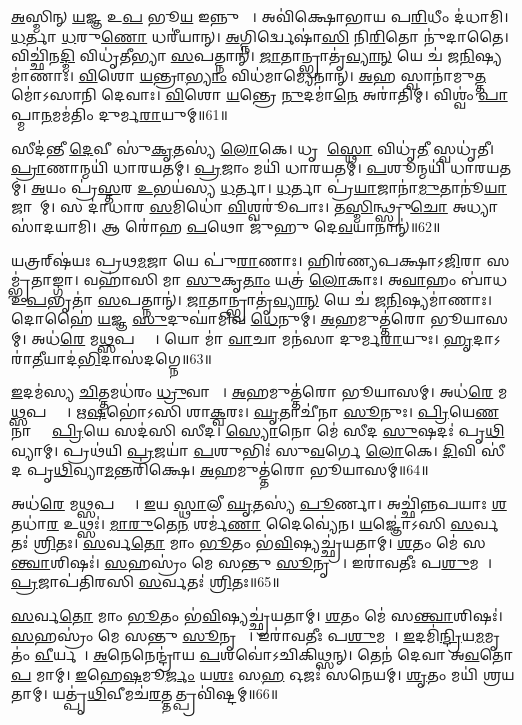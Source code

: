 \ul{𑌅}𑌸𑍍𑌮𑌿𑌨𑍍 \ul{𑌯}𑌜𑍍𑌞 𑌉\ul{𑌪} 𑌭𑍂\ul{𑌯} 𑌇𑌨𑍍𑌨𑍁 𑌮𑍇᳚।
𑌅𑌵𑌿॑𑌕𑍍𑌷𑍋𑌭𑌾𑌯 𑌪\ul{𑌰𑌿}𑌧𑍀𑌂 𑌦॑𑌧𑌾𑌮𑌿।
\ul{𑌧}𑌰𑍍𑌤𑌾 \ul{𑌧}𑌰𑍁\ul{𑌣𑍋} 𑌧𑌰𑍀॑𑌯𑌾𑌨𑍍।
\ul{𑌅}𑌗𑍍𑌨𑌿𑌰𑍍𑌦𑍍𑌵𑍇𑌷𑌾॑\ul{𑌸𑌿} 𑌨𑌿\ul{𑌰𑌿}𑌤𑍋 𑌨𑍁॑𑌦𑌾𑌤𑍈।
𑌵𑌿𑌚𑍍𑌛𑌿॑𑌨\ul{𑌦𑍍𑌮𑌿} 𑌵𑌿𑌧𑍃॑𑌤𑍀𑌭𑍍𑌯𑌾 \ul{𑌸}𑌪𑌤𑍍𑌨𑌾𑌨𑍍॑।
\ul{𑌜𑌾}𑌤𑌾𑌨𑍍𑌭𑍍𑌰𑌾𑌤𑍃॑\ul{𑌵𑍍𑌯𑌾}\ul{𑌨𑍍} 𑌯𑍇 𑌚॑ 𑌜\ul{𑌨𑌿}𑌷𑍍𑌯𑌮𑌾॑𑌣𑌾𑌃।
\ul{𑌵𑌿}𑌶𑍋 \ul{𑌯}𑌨𑍍𑌤𑍍𑌰𑌾\ul{𑌭𑍍𑌯𑌾𑌂} 𑌵𑌿𑌧॑𑌮𑌾𑌮𑍍𑌯𑍇𑌨𑌾𑌨𑍍।
\ul{𑌅}𑌹 𑌸𑍍𑌵𑌾𑌨𑌾॑𑌮𑍁\ul{𑌤𑍍𑌤}𑌮𑍋॑\-𑌽𑌸𑌾𑌨𑌿 𑌦𑍇𑌵𑌾𑌃।
\ul{𑌵𑌿}𑌶𑍋 \ul{𑌯}𑌨𑍍𑌤𑍍𑌰𑍇 \ul{𑌨𑍁}𑌦𑌮𑌾॑\ul{𑌨𑍇} 𑌅𑌰𑌾॑𑌤𑌿𑌮𑍍।
𑌵𑌿𑌶𑍍𑌵𑌂॑ \ul{𑌪𑌾}𑌪𑍍𑌮𑌾\ul{𑌨}𑌮𑌮॑𑌤𑌿𑌂 𑌦𑍁𑌰𑍍𑌮\ul{𑌰𑌾}𑌯𑍁𑌮𑍍॥61॥

𑌸𑍀𑌦॑𑌨𑍍𑌤𑍀 \ul{𑌦𑍇}𑌵𑍀 𑌸𑍁॑\ul{𑌕𑍃}𑌤𑌸𑍍𑌯॑ \ul{𑌲𑍋}𑌕𑍇।
𑌧𑍃𑌤𑍀᳚ \ul{𑌸𑍍𑌥𑍋} 𑌵𑌿𑌧𑍃॑\ul{𑌤𑍀} 𑌸𑍍𑌵𑌧𑍃॑𑌤𑍀।
\ul{𑌪𑍍𑌰𑌾}𑌣𑌾𑌨𑍍𑌮𑌯𑌿॑ 𑌧𑌾𑌰𑌯𑌤𑌮𑍍।
\ul{𑌪𑍍𑌰}𑌜𑌾𑌂 𑌮𑌯𑌿॑ 𑌧𑌾𑌰𑌯𑌤𑌮𑍍।
\ul{𑌪}𑌶𑍂𑌨𑍍𑌮𑌯𑌿॑ 𑌧𑌾𑌰𑌯𑌤𑌮𑍍।
\ul{𑌅}𑌯𑌂 𑌪𑍍𑌰॑\ul{𑌸𑍍𑌤}𑌰 \ul{𑌉}𑌭𑌯॑𑌸𑍍𑌯 \ul{𑌧}𑌰𑍍𑌤𑌾।
\ul{𑌧}𑌰𑍍𑌤𑌾 𑌪𑍍𑌰॑\ul{𑌯𑌾}𑌜𑌾𑌨𑌾॑\ul{𑌮𑍁}𑌤𑌾𑌨𑍂॑\ul{𑌯𑌾}𑌜𑌾𑌨𑌾᳚𑌮𑍍।
𑌸 𑌦𑌾॑𑌧𑌾𑌰 \ul{𑌸}𑌮𑌿𑌧𑍋॑ \ul{𑌵𑌿}𑌶𑍍𑌵𑌰𑍂॑𑌪𑌾𑌃।
𑌤\ul{𑌸𑍍𑌮𑌿}𑌨𑍍𑌥𑍍𑌸𑍍𑌰𑍁\ul{𑌚𑍋} 𑌅𑌧𑍍𑌯𑌾 𑌸𑌾॑𑌦𑌯𑌾𑌮𑌿।
𑌆 𑌰𑍋॑𑌹 \ul{𑌪}𑌥𑍋 𑌜𑍁॑𑌹𑍁 𑌦𑍇\ul{𑌵}𑌯𑌾𑌨𑌾𑌨𑍍॑॥62॥

𑌯𑌤𑍍𑌰𑌰𑍍‌\mbox{}𑌷॑𑌯𑌃 𑌪𑍍𑌰𑌥\ul{𑌮}𑌜𑌾 𑌯𑍇 𑌪𑍁॑\ul{𑌰𑌾}𑌣𑌾𑌃।
𑌹𑌿𑌰॑𑌣𑍍𑌯𑌪𑌕𑍍𑌷𑌾\-𑌽\ul{𑌜𑌿}𑌰𑌾 𑌸𑌮𑍍𑌭𑍃॑𑌤𑌾𑌙𑍍𑌗𑌾।
𑌵𑌹𑌾॑𑌸𑌿 𑌮𑌾 \ul{𑌸𑍁}𑌕𑍃\ul{𑌤𑌾𑌂} 𑌯𑌤𑍍𑌰॑ \ul{𑌲𑍋}𑌕𑌾𑌃।
𑌅\ul{𑌵𑌾}𑌹𑌂 𑌬𑌾॑𑌧 𑌉\ul{𑌪}𑌭𑍃𑌤𑌾॑ \ul{𑌸}𑌪𑌤𑍍𑌨𑌾𑌨𑍍॑।
\ul{𑌜𑌾}𑌤𑌾𑌨𑍍𑌭𑍍𑌰𑌾𑌤𑍃॑\ul{𑌵𑍍𑌯𑌾}\ul{𑌨𑍍} 𑌯𑍇 𑌚॑ 𑌜\ul{𑌨𑌿}𑌷𑍍𑌯𑌮𑌾॑𑌣𑌾𑌃।
𑌦𑍋𑌹𑍈॑ \ul{𑌯}𑌜𑍍𑌞 \ul{𑌸𑍁}𑌦𑍁𑌘𑌾॑𑌮𑌿𑌵 \ul{𑌧𑍇}𑌨𑍁𑌮𑍍।
\ul{𑌅}𑌹𑌮𑍁𑌤𑍍𑌤॑𑌰𑍋 𑌭𑍂𑌯𑌾𑌸𑌮𑍍।
𑌅𑌧॑\ul{𑌰𑍇} 𑌮\ul{𑌥𑍍𑌸}𑌪𑌤𑍍𑌨𑌾𑌃᳚।
𑌯𑍋 𑌮𑌾॑ \ul{𑌵𑌾}𑌚𑌾 𑌮𑌨॑𑌸𑌾 𑌦𑍁𑌰𑍍𑌮\ul{𑌰𑌾}𑌯𑍁𑌃।
\ul{𑌹𑍃}𑌦𑌾\-𑌽𑌰𑌾॑\ul{𑌤𑍀}𑌯𑌾𑌦॑\ul{𑌭𑌿}𑌦𑌾𑌸॑𑌦𑌗𑍍𑌨𑍇॥63॥

\ul{𑌇}𑌦𑌮॑𑌸𑍍𑌯 \ul{𑌚𑌿}𑌤𑍍𑌤𑌮𑌧॑𑌰𑌂 \ul{𑌧𑍍𑌰𑍁}𑌵𑌾𑌯𑌾𑌃᳚।
\ul{𑌅}𑌹𑌮𑍁𑌤𑍍𑌤॑𑌰𑍋 𑌭𑍂𑌯𑌾𑌸𑌮𑍍।
𑌅𑌧॑\ul{𑌰𑍇} 𑌮\ul{𑌥𑍍𑌸}𑌪𑌤𑍍𑌨𑌾𑌃᳚।
\ul{𑌋}\ul{𑌷}𑌭𑍋॑𑌽𑌸𑌿 𑌶𑌾\ul{𑌕𑍍𑌵}𑌰𑌃।
\ul{𑌘𑍃}𑌤𑌾𑌚𑍀॑𑌨𑌾 \ul{𑌸𑍂}𑌨𑍁𑌃।
\ul{𑌪𑍍𑌰𑌿}𑌯𑍇\ul{𑌣} 𑌨𑌾𑌮𑍍𑌨𑌾᳚ \ul{𑌪𑍍𑌰𑌿}𑌯𑍇 𑌸𑌦॑𑌸𑌿 𑌸𑍀𑌦।
\ul{𑌸𑍍𑌯𑍋}𑌨𑍋 𑌮𑍇॑ 𑌸𑍀𑌦 \ul{𑌸𑍁}𑌷𑌦𑌃॑ 𑌪𑍃\ul{𑌥𑌿}𑌵𑍍𑌯𑌾𑌮𑍍।
𑌪𑍍𑌰𑌥॑𑌯𑌿 \ul{𑌪𑍍𑌰}𑌜𑌯𑌾॑ \ul{𑌪}𑌶𑍁𑌭𑌿𑌃॑ 𑌸𑍁\ul{𑌵}𑌰𑍍𑌗𑍇 \ul{𑌲𑍋}𑌕𑍇।
\ul{𑌦𑌿}𑌵𑌿 𑌸𑍀॑𑌦 𑌪𑍃\ul{𑌥𑌿}𑌵𑍍𑌯𑌾\ul{𑌮}𑌨𑍍𑌤𑌰𑌿॑𑌕𑍍𑌷𑍇।
\ul{𑌅}𑌹𑌮𑍁𑌤𑍍𑌤॑𑌰𑍋 𑌭𑍂𑌯𑌾𑌸𑌮𑍍॥64॥

𑌅𑌧॑\ul{𑌰𑍇} 𑌮\ul{𑌥𑍍𑌸}𑌪𑌤𑍍𑌨𑌾𑌃᳚।
\ul{𑌇}𑌯 \ul{𑌸𑍍𑌥𑌾}𑌲𑍀 \ul{𑌘𑍃}𑌤𑌸𑍍𑌯॑ \ul{𑌪𑍂}𑌰𑍍𑌣𑌾।
𑌅𑌚𑍍𑌛𑌿॑𑌨𑍍𑌨𑌪𑌯𑌾𑌃 \ul{𑌶}𑌤𑌧𑌾॑\ul{𑌰} 𑌉𑌥𑍍𑌸𑌃॑।
\ul{𑌮𑌾}\ul{𑌰𑍁}𑌤𑍇\ul{𑌨} 𑌶𑌰𑍍𑌮॑\ul{𑌣𑌾} 𑌦𑍈𑌵𑍍𑌯𑍇॑𑌨।
\ul{𑌯}𑌜𑍍𑌞𑍋॑𑌽𑌸𑌿 \ul{𑌸}𑌰𑍍𑌵𑌤𑌃॑ \ul{𑌶𑍍𑌰𑌿}𑌤𑌃।
\ul{𑌸}𑌰𑍍𑌵\ul{𑌤𑍋} 𑌮𑌾𑌂 \ul{𑌭𑍂}𑌤𑌂 𑌭॑\ul{𑌵𑌿}𑌷𑍍𑌯𑌚𑍍𑌛𑍍𑌰॑𑌯𑌤𑌾𑌮𑍍।
\ul{𑌶}𑌤𑌂 𑌮𑍇॑ 𑌸\ul{𑌨𑍍𑌤𑍍𑌵𑌾}𑌶𑌿𑌷𑌃॑।
\ul{𑌸}𑌹𑌸𑍍𑌰𑌂॑ 𑌮𑍇 𑌸𑌨𑍍𑌤𑍁 \ul{𑌸𑍂}𑌨𑍃𑌤𑌾𑌃᳚।
𑌇𑌰𑌾॑𑌵𑌤𑍀𑌃 𑌪\ul{𑌶𑍁}𑌮𑌤𑍀𑌃᳚।
\ul{𑌪𑍍𑌰}𑌜𑌾𑌪॑𑌤𑌿𑌰𑌸𑌿 \ul{𑌸}𑌰𑍍𑌵𑌤𑌃॑ \ul{𑌶𑍍𑌰𑌿}𑌤𑌃॥65॥

\ul{𑌸}𑌰𑍍𑌵\ul{𑌤𑍋} 𑌮𑌾𑌂 \ul{𑌭𑍂}𑌤𑌂 𑌭॑\ul{𑌵𑌿}𑌷𑍍𑌯𑌚𑍍𑌛𑍍𑌰॑𑌯𑌤𑌾𑌮𑍍।
\ul{𑌶}𑌤𑌂 𑌮𑍇॑ 𑌸\ul{𑌨𑍍𑌤𑍍𑌵𑌾}𑌶𑌿𑌷𑌃॑।
\ul{𑌸}𑌹𑌸𑍍𑌰𑌂॑ 𑌮𑍇 𑌸𑌨𑍍𑌤𑍁 \ul{𑌸𑍂}𑌨𑍃𑌤𑌾𑌃᳚।
𑌇𑌰𑌾॑𑌵𑌤𑍀𑌃 𑌪\ul{𑌶𑍁}𑌮𑌤𑍀𑌃᳚।
\ul{𑌇}𑌦𑌮𑌿॑\ul{𑌨𑍍𑌦𑍍𑌰𑌿}𑌯\ul{𑌮}𑌮𑍃𑌤𑌂॑ \ul{𑌵𑍀}𑌰𑍍𑌯𑌮𑍍᳚।
\ul{𑌅}𑌨𑍇𑌨𑍇𑌨𑍍𑌦𑍍𑌰𑌾॑𑌯 \ul{𑌪}𑌶𑌵𑍋॑\-𑌽𑌚𑌿𑌕𑌿𑌥𑍍𑌸𑌨𑍍।
𑌤𑍇𑌨॑ 𑌦𑍇𑌵𑌾 𑌅\ul{𑌵}𑌤𑍋\ul{𑌪} 𑌮𑌾𑌮𑍍।
\ul{𑌇}𑌹𑍇\ul{𑌷}𑌮𑍂\ul{𑌰𑍍𑌜𑌂} 𑌯\ul{𑌶𑌃} 𑌸\ul{𑌹} 𑌓𑌜𑌃॑ 𑌸𑌨𑍇𑌯𑌮𑍍।
\ul{𑌶𑍃}𑌤𑌂 𑌮𑌯𑌿॑ 𑌶𑍍𑌰𑌯𑌤𑌾𑌮𑍍।
𑌯𑌤𑍍𑌪𑍃॑\ul{𑌥𑌿}𑌵𑍀𑌮𑌚॑\ul{𑌰}𑌤𑍍𑌤𑌤𑍍𑌪𑍍𑌰𑌵𑌿॑𑌷𑍍𑌟𑌮𑍍॥66॥

